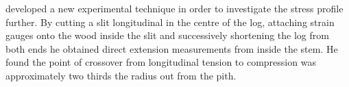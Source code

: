 \citet{boyd1950a} developed a new experimental technique in order to investigate the
stress profile further. By cutting a slit longitudinal in the centre of the
log, attaching strain gauges onto the wood inside the slit and successively
shortening the log from both ends he obtained direct extension measurements from
inside the stem. He found the point of crossover from longitudinal tension to compression was approximately two thirds the radius out from the pith. 